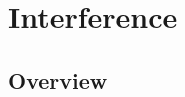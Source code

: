 \renewcommand{\lastmod}{September 18, 2023}
\renewcommand{\chapterauthors}{Markus Lippitz}

\chapter{Interference}

\section{Overview}



\printbibliography[segment=\therefsegment,heading=subbibliography]
